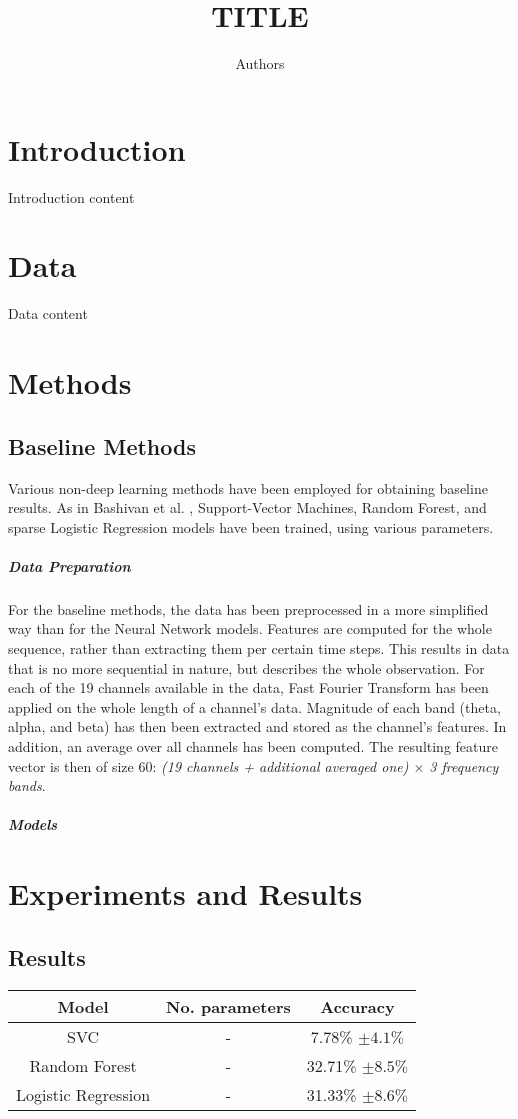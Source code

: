\documentclass{article}
\title{TITLE}
\author{Authors}
\begin{document}
\maketitle
{}
	

\maketitle

\section{Introduction}
Introduction content

\section{Data}
Data content

\section{Methods}
\subsection{Baseline Methods}
Various non-deep learning methods have been employed for obtaining baseline results.
As in Bashivan et al. \cite[pp. 7-8]{learning_eeg_repr}, Support-Vector Machines, Random Forest, and sparse Logistic Regression models have been trained, using various parameters.
\subparagraph{Data Preparation}
For the baseline methods, the data has been preprocessed in a more simplified way than for the Neural Network models. Features are computed for the whole sequence, rather than extracting them per certain time steps. This results in data that is no more sequential in nature, but describes the whole observation.
For each of the 19 channels available in the data, Fast Fourier Transform has been applied on the whole length of a channel's data. Magnitude of each band (theta, alpha, and beta) has then been extracted and stored as the channel's features. In addition, an average over all channels has been computed. The resulting feature vector is then of size 60: \textit{(19 channels + additional averaged one) $\times$ 3 frequency bands}.
\subparagraph{Models}


\section{Experiments and Results}
\subsection{Results}
\begin{center}
\begin{tabular}{ c|c|c } 
 Model & No. parameters & Accuracy \\ 
 \hline
 SVC & - & 7.78\% $\pm 4.1\% $\\ 
 Random Forest & - & 32.71\% $\pm 8.5\%$ \\ 
 Logistic Regression & - & 31.33\% $\pm 8.6\%$ \\ 
\end{tabular}
\end{center}
\end{document}
